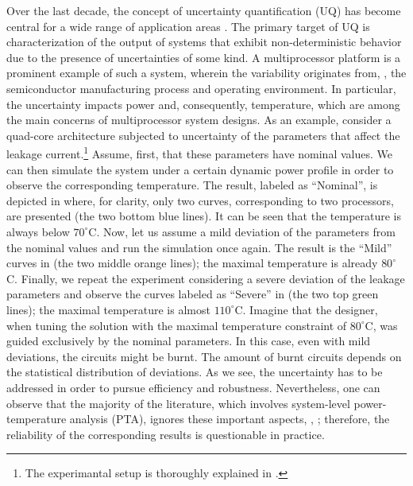 
Over the last decade, the concept of uncertainty quantification (UQ) has become central for a wide range of application areas \cite{xiu2010, eldred2009}. The primary target of UQ is characterization of the output of systems that exhibit non-deterministic behavior due to the presence of uncertainties of some kind. A multiprocessor platform is a prominent example of such a system, wherein the variability originates from, \eg, the semiconductor manufacturing process and operating environment. In particular, the uncertainty impacts power and, consequently, temperature, which are among the main concerns of multiprocessor system designs. As an example, consider a quad-core architecture subjected to uncertainty of the parameters that affect the leakage current.\footnote{The experimantal setup is thoroughly explained in .} Assume, first, that these parameters have nominal values. We can then simulate the system under a certain dynamic power profile in order to observe the corresponding temperature. The result, labeled as ``Nominal'', is depicted in  where, for clarity, only two curves, corresponding to two processors, are presented (the two bottom blue lines). It can be seen that the temperature is always below $70^{\circ}$C. Now, let us assume a mild deviation of the parameters from the nominal values and run the simulation once again. The result is the ``Mild'' curves in  (the two middle orange lines); the maximal temperature is already $80^{\circ}$C. Finally, we repeat the experiment considering a severe deviation of the leakage parameters and observe the curves labeled as ``Severe'' in  (the two top green lines); the maximal temperature is almost $110^{\circ}$C. Imagine that the designer, when tuning the solution with the maximal temperature constraint of $80^\circ$C, was guided exclusively by the nominal parameters. In this case, even with mild deviations, the circuits might be burnt. The amount of burnt circuits depends on the statistical distribution of deviations. As we see, the uncertainty has to be addressed in order to pursue efficiency and robustness. Nevertheless, one can observe that the majority of the literature, which involves system-level power-temperature analysis (PTA), ignores these important aspects, \eg, \cite{rao2009, rai2011, thiele2011, ukhov2012}; therefore, the reliability of the corresponding results is questionable in practice.

